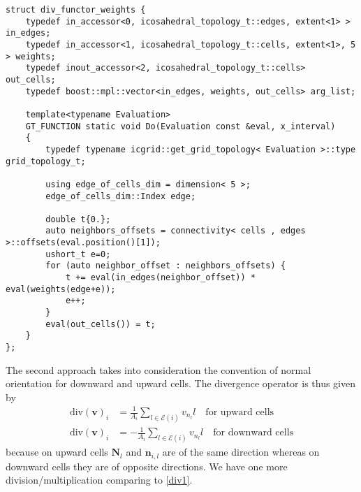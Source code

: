 \documentclass[12pt]{article}
\begin{document}
\begin{lstlisting}
struct div_functor_weights {
    typedef in_accessor<0, icosahedral_topology_t::edges, extent<1> > in_edges;
    typedef in_accessor<1, icosahedral_topology_t::cells, extent<1>, 5 > weights;
    typedef inout_accessor<2, icosahedral_topology_t::cells> out_cells;
    typedef boost::mpl::vector<in_edges, weights, out_cells> arg_list;

    template<typename Evaluation>
    GT_FUNCTION static void Do(Evaluation const &eval, x_interval)
    {
        typedef typename icgrid::get_grid_topology< Evaluation >::type grid_topology_t;

        using edge_of_cells_dim = dimension< 5 >;
        edge_of_cells_dim::Index edge;

        double t{0.};
        auto neighbors_offsets = connectivity< cells , edges >::offsets(eval.position()[1]);
        ushort_t e=0;
        for (auto neighbor_offset : neighbors_offsets) {
            t += eval(in_edges(neighbor_offset)) * eval(weights(edge+e));
            e++;
        }
        eval(out_cells()) = t;
    }
};
\end{lstlisting}

The second approach takes into consideration the convention of normal orientation for downward and upward cells. The divergence operator is thus given by
\begin{align}
  \text{div}(\bm{v})_i& = \frac{1}{A_i}\sum\limits_{l\in\mathcal{E}(i)}v_{n_l}l \quad \text{for upward cells} \\
  \text{div}(\bm{v})_i& = -\frac{1}{A_i}\sum\limits_{l\in\mathcal{E}(i)}v_{n_l}l \quad \text{for downward cells}
\end{align}
because on upward cells $\bm{N}_l$ and $\bm{n}_{i,l}$ are of the same direction whereas on downward cells they are of opposite directions. We have one more division/multiplication comparing to \cref{div1}.
\end{document}
